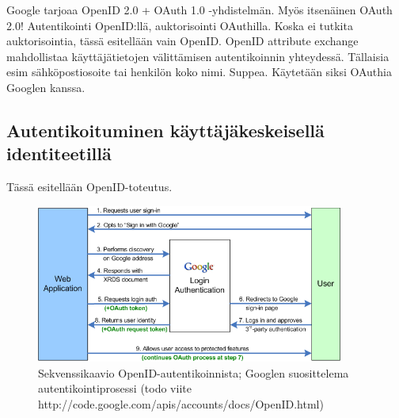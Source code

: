 \documentclass[finnish,gradu]{tktltiki}
\begin{document}

  Google tarjoaa OpenID 2.0 + OAuth 1.0 -yhdistelmän. Myös itsenäinen OAuth 2.0!  Autentikointi OpenID:llä, auktorisointi OAuthilla. Koska ei tutkita auktorisointia, tässä esitellään vain OpenID.
  OpenID attribute exchange mahdollistaa käyttäjätietojen välittämisen autentikoinnin yhteydessä. Tällaisia esim sähköpostiosoite tai henkilön koko nimi. Suppea. Käytetään siksi OAuthia Googlen kanssa.


  \subsection{Autentikoituminen käyttäjäkeskeisellä identiteetillä} %
  \label{sub:autentikoituminen_käyttäjäkeskeisellä_identiteetillä}

  Tässä esitellään OpenID-toteutus.

  \begin{figure}
    \centering
    \includegraphics[width=0.9\textwidth]{images/google_openid_diagram.png}
    \caption{Sekvenssikaavio OpenID-autentikoinnista; Googlen suosittelema autentikointiprosessi (todo viite http://code.google.com/apis/accounts/docs/OpenID.html)}
    \label{fig:sekvenssikaavio_google_openid}
  \end{figure}
\end{document}
